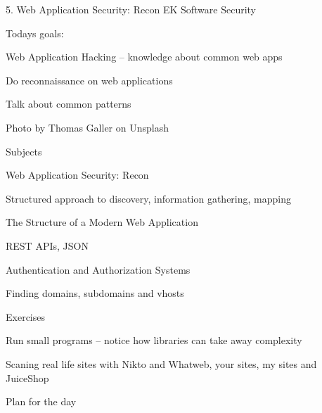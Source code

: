 \documentclass[Screen16to9,17pt]{foils}
\begin{document}
\mytitlepage
{5. Web Application Security: Recon}
{EK  Software Security}



Todays goals:
\begin{list2}
\item Web Application Hacking -- knowledge about common web apps
\item Do reconnaissance on web applications
\item Talk about common patterns
\end{list2}

Photo by Thomas Galler on Unsplash




\begin{list1}
\item Subjects
\item Web Application Security: Recon
\begin{list2}
\item Structured approach to discovery, information gathering, mapping
\item The Structure of a Modern Web Application
\item REST APIs, JSON
\item Authentication and Authorization Systems
\item Finding domains, subdomains and vhosts
\end{list2}
\item Exercises
\begin{list2}
\item Run small programs -- notice how libraries can take away complexity
\item Scaning real life sites with Nikto and Whatweb, your sites, my sites and JuiceShop
\end{list2}
\end{list1}


Plan for the day
\end{document}
